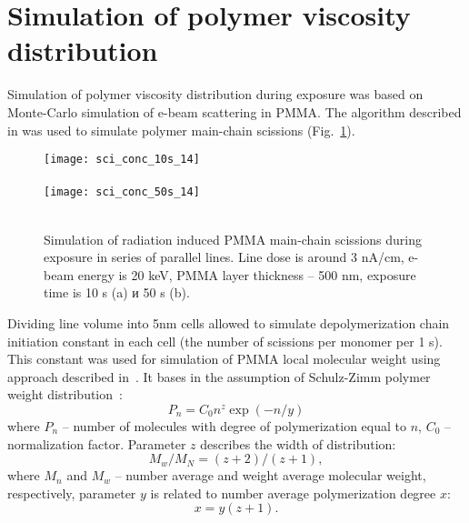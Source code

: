 \documentclass[12pt, letterpaper]{article}
\begin{document}
\section{Simulation of polymer viscosity distribution}
Simulation of polymer viscosity distribution during exposure was based on Monte-Carlo simulation of e-beam scattering in PMMA. The algorithm described in \cite{my_MEE} was used to simulate polymer main-chain scissions (Fig.~\ref{fig:sci_hist}).

\begin{figure}[t]
	\begin{center}
		\texttt{[image: sci\_conc\_10s\_14]} \\
		\vspace{-3.7em}  \vspace{2em} \\
		\texttt{[image: sci\_conc\_50s\_14]} \\
		\vspace{-3.7em}  \vspace{2em} \\
	\end{center}
	\vspace{-1.5em}
	\caption{Simulation of radiation induced PMMA main-chain scissions during exposure in series of parallel lines. Line dose is around 3 nA/cm, e-beam energy is 20 keV, PMMA layer thickness -- 500 nm, exposure time is 10 s (a) и 50 s (b).}
	\label{fig:sci_hist}
\end{figure}

Dividing line volume into 5nm cells allowed to simulate depolymerization chain initiation constant in each cell (the number of scissions per monomer per 1 s). This constant was used for simulation of PMMA local molecular weight using approach described in~\cite{Boyd_1, Boyd_2, Boyd_3}. It bases in the assumption of Schulz-Zimm polymer weight distribution~\cite{Schulz-Zimm_distribution}:
\begin{equation} \label{eq:Schulz-Zimm_distribution}
	P_n = C_0 n^z \exp (-n/y)
\end{equation}
where $P_n$ -- number of molecules with degree of polymerization equal to $n$, $C_0$ -- normalization factor. Parameter $z$ describes the width of distribution:
\begin{equation} \label{eq:Schulz-Zimm_1}
	M_w / M_N=(z+2) /(z+1),
\end{equation}
where $M_n$ and $M_w$ -- number average and weight average molecular weight, respectively, parameter $y$ is related to number average polymerization degree $x$:
\begin{equation} \label{eq:Schulz-Zimm_2}
	x=y(z+1).
\end{equation}
\end{document}
